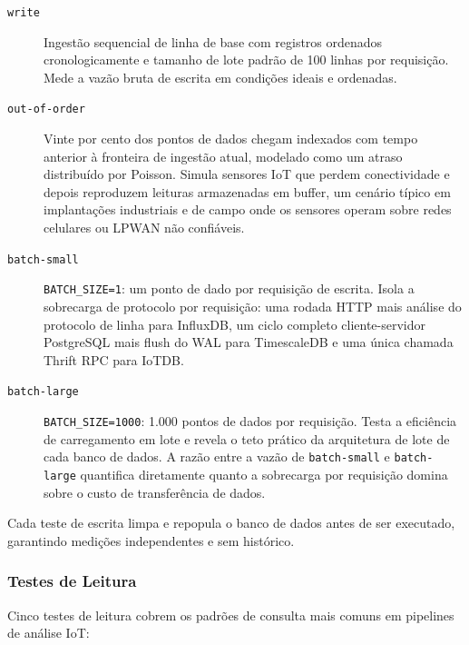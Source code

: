 \begin{description}
  \item[\texttt{write}] Ingestão sequencial de linha de base com registros ordenados cronologicamente e tamanho de lote padrão de 100 linhas por requisição. Mede a vazão bruta de escrita em condições ideais e ordenadas.

  \item[\texttt{out-of-order}] Vinte por cento dos pontos de dados chegam indexados com tempo anterior à fronteira de ingestão atual, modelado como um atraso distribuído por Poisson. Simula sensores IoT que perdem conectividade e depois reproduzem leituras armazenadas em buffer, um cenário típico em implantações industriais e de campo onde os sensores operam sobre redes celulares ou LPWAN não confiáveis.

  \item[\texttt{batch-small}] \texttt{BATCH\_SIZE=1}: um ponto de dado por requisição de
    escrita. Isola a sobrecarga de protocolo por requisição: uma rodada HTTP mais análise do
    protocolo de linha para InfluxDB, um ciclo completo cliente-servidor PostgreSQL mais flush
    do WAL para TimescaleDB e uma única chamada Thrift RPC para IoTDB.

  \item[\texttt{batch-large}] \texttt{BATCH\_SIZE=1000}: 1.000 pontos de dados por requisição.
    Testa a eficiência de carregamento em lote e revela o teto prático da arquitetura de lote de
    cada banco de dados. A razão entre a vazão de \texttt{batch-small} e \texttt{batch-large}
    quantifica diretamente quanto a sobrecarga por requisição domina sobre o custo de
    transferência de dados.
\end{description}

Cada teste de escrita limpa e repopula o banco de dados antes de ser executado, garantindo
medições independentes e sem histórico.

\subsubsection{Testes de Leitura}

Cinco testes de leitura cobrem os padrões de consulta mais comuns em pipelines de análise IoT:

